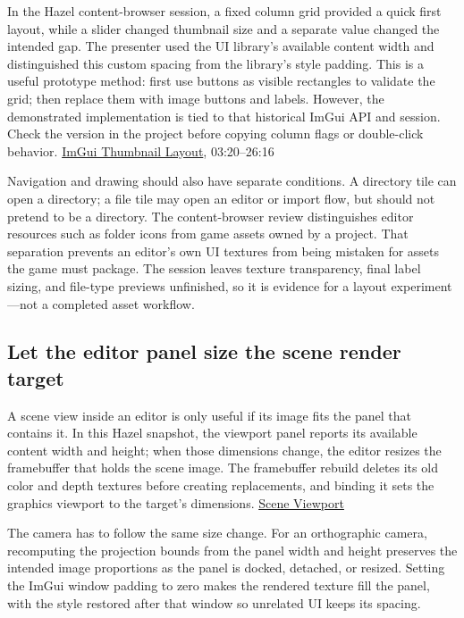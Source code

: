 In the Hazel content-browser session, a fixed column grid provided a quick first layout, while a slider changed thumbnail size and a separate value changed the intended gap. The presenter used the UI library's available content width and distinguished this custom spacing from the library's style padding. This is a useful prototype method: first use buttons as visible rectangles to validate the grid; then replace them with image buttons and labels. However, the demonstrated implementation is tied to that historical ImGui API and session. Check the version in the project before copying column flags or double-click behavior. \href{https://www.youtube.com/watch?v=uQljBVVb-lU}{ImGui Thumbnail Layout}, 03:20--26:16

Navigation and drawing should also have separate conditions. A directory tile can open a directory; a file tile may open an editor or import flow, but should not pretend to be a directory. The content-browser review distinguishes editor resources such as folder icons from game assets owned by a project. That separation prevents an editor's own UI textures from being mistaken for assets the game must package. The session leaves texture transparency, final label sizing, and file-type previews unfinished, so it is evidence for a layout experiment---not a completed asset workflow.

\subsection{Let the editor panel size the scene render target}\label{06-engine-ii-ch032-let-the-editor-panel-size-the-scene-render-target}

A scene view inside an editor is only useful if its image fits the panel that contains it. In this Hazel snapshot, the viewport panel reports its available content width and height; when those dimensions change, the editor resizes the framebuffer that holds the scene image. The framebuffer rebuild deletes its old color and depth textures before creating replacements, and binding it sets the graphics viewport to the target's dimensions. \href{https://www.youtube.com/watch?v=xiSW4UgjLKU}{Scene Viewport}

The camera has to follow the same size change. For an orthographic camera, recomputing the projection bounds from the panel width and height preserves the intended image proportions as the panel is docked, detached, or resized. Setting the ImGui window padding to zero makes the rendered texture fill the panel, with the style restored after that window so unrelated UI keeps its spacing.

